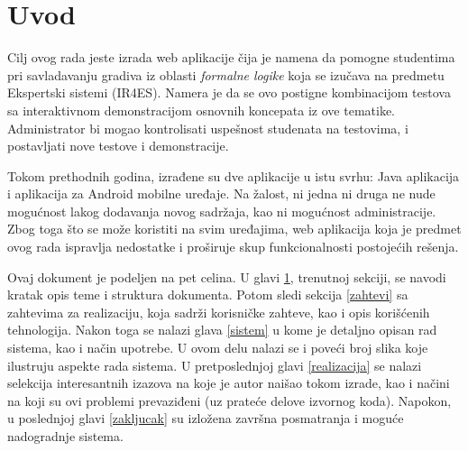 \chapter{Uvod}\label{uvod}
Cilj ovog rada jeste izrada web aplikacije čija je namena da pomogne studentima pri savladavanju gradiva iz oblasti \emph{formalne logike} koja se izučava na predmetu Ekspertski sistemi (IR4ES). Namera je da se ovo postigne kombinacijom testova sa interaktivnom demonstracijom osnovnih koncepata iz ove tematike. Administrator bi mogao kontrolisati uspešnost studenata na testovima, i postavljati nove testove i demonstracije.

Tokom prethodnih godina, izrađene su dve aplikacije u istu svrhu: Java aplikacija i aplikacija za Android mobilne uređaje. Na žalost, ni jedna ni druga ne nude mogućnost lakog dodavanja novog sadržaja, kao ni mogućnost administracije. Zbog toga što se može koristiti na svim uređajima, web aplikacija koja je predmet ovog rada ispravlja nedostatke i proširuje skup funkcionalnosti postojećih rešenja.

Ovaj dokument je podeljen na pet celina. U glavi \ref{uvod}, trenutnoj sekciji, se navodi kratak opis teme i struktura dokumenta. Potom sledi sekcija \ref{zahtevi} sa zahtevima za realizaciju, koja sadrži korisničke zahteve, kao i opis korišćenih tehnologija. Nakon toga se nalazi glava \ref{sistem} u kome je detaljno opisan rad sistema, kao i način upotrebe. U ovom delu nalazi se i poveći broj slika koje ilustruju aspekte rada sistema. U pretposlednjoj glavi \ref{realizacija} se nalazi selekcija interesantnih izazova na koje je autor naišao tokom izrade, kao i načini na koji su ovi problemi prevaziđeni (uz prateće delove izvornog koda). Napokon, u poslednjoj glavi \ref{zakljucak} su izložena završna posmatranja i moguće nadogradnje sistema.